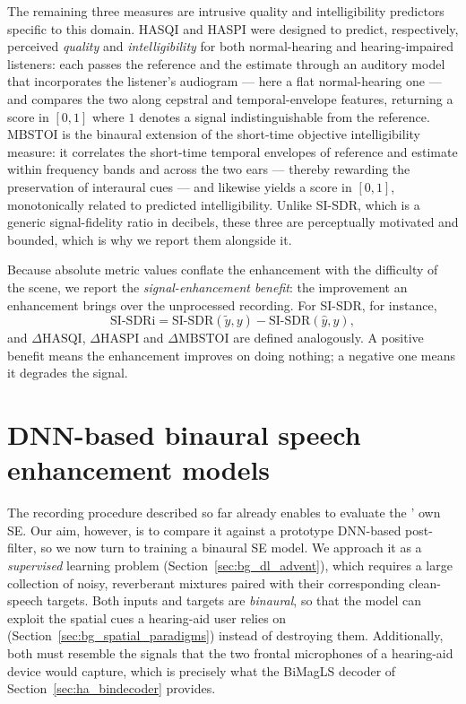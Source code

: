 The remaining three measures are intrusive quality and intelligibility
predictors specific to this domain. \acrshort{HASQI} and \acrshort{HASPI} were
designed to predict, respectively, perceived \emph{quality} and
\emph{intelligibility} for both normal-hearing and hearing-impaired listeners:
each passes the reference and the estimate through an auditory model that
incorporates the listener's audiogram --- here a flat normal-hearing one --- and
compares the two along cepstral and temporal-envelope features, returning a score
in $[0, 1]$ where $1$ denotes a signal indistinguishable from the reference.
\acrshort{MBSTOI} \citep{andersen2018refinement} is the binaural extension of the
short-time objective intelligibility measure: it correlates the short-time
temporal envelopes of reference and estimate within frequency bands and across
the two ears --- thereby rewarding the preservation of interaural cues --- and
likewise yields a score in $[0, 1]$, monotonically related to predicted
intelligibility. Unlike \acrshort{SI-SDR}, which is a generic signal-fidelity
ratio in decibels, these three are perceptually motivated and bounded, which is
why we report them alongside it.

Because absolute metric values conflate the enhancement with the difficulty of
the scene, we report the \emph{signal-enhancement benefit}: the improvement an
enhancement brings over the unprocessed recording. For \acrshort{SI-SDR}, for
instance,
\begin{equation}
    \mathrm{SI\text{-}SDRi} = \mathrm{SI\text{-}SDR}(\tilde{y}, y) - \mathrm{SI\text{-}SDR}(\hat{y}, y),
    \label{eq:benefit}
\end{equation}
and $\Delta\mathrm{HASQI}$, $\Delta\mathrm{HASPI}$ and $\Delta\mathrm{MBSTOI}$ are
defined analogously. A positive benefit means the enhancement improves on doing
nothing; a negative one means it degrades the signal.

\section{DNN-based binaural speech enhancement models}
\label{sec:ha_dnn}

The recording procedure described so far already enables to evaluate 
the ' own \acrshort{SE}. Our aim, however, is to compare it against a prototype \acrshort{DNN}-based post-filter, so we now turn to training a binaural \acrshort{SE} model. We approach it as a
\emph{supervised} learning problem (Section~\ref{sec:bg_dl_advent}), which
requires a large collection of noisy, reverberant mixtures paired with their
corresponding clean-speech targets. Both inputs and targets are \emph{binaural}, so that the model can exploit the
spatial cues a hearing-aid user relies on (Section~\ref{sec:bg_spatial_paradigms})
instead of destroying them. Additionally, both must resemble the signals that the
two frontal microphones of a hearing-aid device would capture, which is
precisely what the  \acrshort{BiMagLS} decoder of
Section~\ref{sec:ha_bindecoder} provides.

